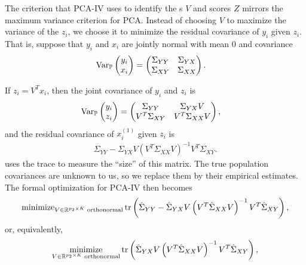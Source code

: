 \documentclass{article}
\begin{document}
The criterion that PCA-IV uses to identify the s $V$ and scores $Z$
mirrors the maximum variance criterion for PCA. Instead of choosing $V$ to
maximize the variance of the $z_{i}$, we choose it to minimize the residual
covariance of $y_{i}$ given $z_{i}$. That is, suppose that $y_{i}$ and $x_{i}$
are jointly normal with mean 0 and covariance
\begin{align*}
\mathrm{Var}_{\mathbb{P}}\begin{pmatrix}y_{i} \\ x_{i}\end{pmatrix} &=
\begin{pmatrix}
  \Sigma_{YY} & \Sigma_{YX} \\
  \Sigma_{XY} & \Sigma_{XX}
\end{pmatrix}.
\end{align*}

If $z_{i} = V^{T}x_{i}$, then the joint covariance of $y_{i}$ and $z_{i}$ is
\begin{align*}
  \mathrm{Var}_{\mathbb{P}}\begin{pmatrix} y_{i} \\ z_{i} \end{pmatrix} &=
  \begin{pmatrix}
    \Sigma_{YY} & \Sigma_{YX}V \\
    V^{T}\Sigma_{XY} & V^{T}\Sigma_{XX}V
  \end{pmatrix},
\end{align*}
and the residual covariance of $x_{i}^{(1)}$ given $z_{i}$ is
\begin{align}
  \Sigma_{YY} -
  \Sigma_{YX}V\left(V^{T}\Sigma_{XX}V\right)^{-1}V^{T}\Sigma_{XY}. \label{eq:pca_iv_resid_cov}
\end{align}
\citep{rao1964use} uses the trace to measure the ``size'' of this matrix. The
true population covariances are unknown to us, so we replace them by their
empirical estimates. The formal optimization for PCA-IV then becomes
\begin{align}
  \text{minimize}_{V\in \mathbb{R}^{p_{2} \times K} \text{ orthonormal}}
  \mathop\mathrm{tr}\left(\hat{\Sigma}_{YY} -
  \hat{\Sigma}_{YX}V\left(V^{T}\hat{\Sigma}_{XX}V\right)^{-1}V^{T}\hat{\Sigma}_{XY}\right) \label{eq:pca_iv_obj},
\end{align}
or, equivalently,
\begin{align}
  \mathop\mathrm{minimize}_{V\in \mathbb{R}^{p_{2} \times K} \text{ orthonormal}}
  \mathop\mathrm{tr}\left(\hat{\Sigma}_{YX}V\left(V^{T}\hat{\Sigma}_{XX}V\right)^{-1}V^{T}\hat{\Sigma}_{XY}\right) \label{eq:pca_iv_obj_2},
\end{align}
\end{document}
